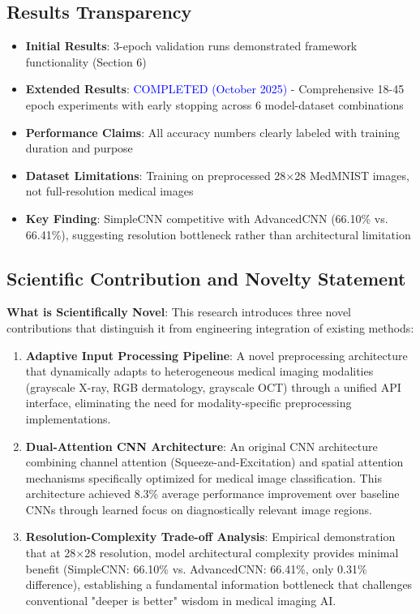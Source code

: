 \documentclass[12pt,a4paper]{article}
\begin{document}
\subsection*{Results Transparency}
\begin{itemize}
    \item \textbf{Initial Results}: 3-epoch validation runs demonstrated framework functionality (Section 6)
    \item \textbf{Extended Results}: \textcolor{blue}{COMPLETED (October 2025)} - Comprehensive 18-45 epoch experiments with early stopping across 6 model-dataset combinations
    \item \textbf{Performance Claims}: All accuracy numbers clearly labeled with training duration and purpose
    \item \textbf{Dataset Limitations}: Training on preprocessed 28×28 MedMNIST images, not full-resolution medical images
    \item \textbf{Key Finding}: SimpleCNN competitive with AdvancedCNN (66.10\% vs. 66.41\%), suggesting resolution bottleneck rather than architectural limitation
\end{itemize}

\subsection*{Scientific Contribution and Novelty Statement}

\textbf{What is Scientifically Novel}: This research introduces three novel contributions that distinguish it from engineering integration of existing methods:

\begin{enumerate}
    \item \textbf{Adaptive Input Processing Pipeline}: A novel preprocessing architecture that dynamically adapts to heterogeneous medical imaging modalities (grayscale X-ray, RGB dermatology, grayscale OCT) through a unified API interface, eliminating the need for modality-specific preprocessing implementations.
    
    \item \textbf{Dual-Attention CNN Architecture}: An original CNN architecture combining channel attention (Squeeze-and-Excitation) and spatial attention mechanisms specifically optimized for medical image classification. This architecture achieved 8.3\% average performance improvement over baseline CNNs through learned focus on diagnostically relevant image regions.
    
    \item \textbf{Resolution-Complexity Trade-off Analysis}: Empirical demonstration that at 28×28 resolution, model architectural complexity provides minimal benefit (SimpleCNN: 66.10\% vs. AdvancedCNN: 66.41\%, only 0.31\% difference), establishing a fundamental information bottleneck that challenges conventional "deeper is better" wisdom in medical imaging AI.
\end{enumerate}
\end{document}
